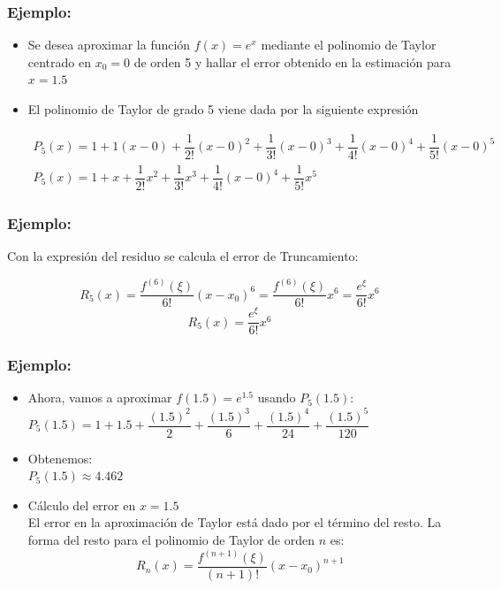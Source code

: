 \documentclass[10pt]{beamer}
\begin{document}
\begin{frame}
  \frametitle{Ejemplo:}
  \begin{itemize}
    \item Se  desea aproximar la funci\'on $f(x)=e^x$ mediante el polinomio de Taylor centrado en $x_0=0$ de orden 5 y hallar el error obtenido en la estimaci\'on para $x=1.5$ 
   
    \item El polinomio de Taylor de grado 5 viene dada por la siguiente expresi\'on
    \begin{block}{}
    \scriptsize{
    $$
    \begin{array}{c}
      P_5(x) = 1+1(x-0)+\dfrac{1}{2!}(x-0)^2+\dfrac{1}{3!}(x-0)^3+\dfrac{1}{4!}(x-0)^4+\dfrac{1}{5!}(x-0)^5\\[10pt]
      P_5(x) = 1+x+\dfrac{1}{2!}x^2+\dfrac{1}{3!}x^3+\dfrac{1}{4!}(x-0)^4+\dfrac{1}{5!}x^5
    \end{array}
    $$}
    \end{block}
  \end{itemize}
\end{frame}
\begin{frame}
  \frametitle[short title]{Ejemplo:}
  Con la expresi\'on del residuo se calcula el error de Truncamiento:
  \begin{block}{}
    $$
    R_5(x) = \dfrac{f^{(6)}(\xi)}{6!}(x-x_0)^6=\dfrac{f^{(6)}(\xi)}{6!}x^6 = \dfrac{e^\xi}{6!}x^6
    $$
    $$
    R_5(x)=\dfrac{e^\xi}{6!}x^6
    $$
  \end{block}
\end{frame}
\begin{frame}
\frametitle{Ejemplo:}
 \begin{itemize}
   \item Ahora, vamos a aproximar $f(1.5) = e^{1.5}$ usando $P_5(1.5)$:\\
   $P_5(1.5) = 1 + 1.5 + \dfrac{(1.5)^2}{2} + \dfrac{(1.5)^3}{6} + \dfrac{(1.5)^4}{24} + \dfrac{(1.5)^5}{120}$
 \item<2-> Obtenemos:\\
   $P_5(1.5) \approx 4.462$
 \item<3-> C\'alculo del error en $x = 1.5$\\
 El error en la aproximaci\'on de Taylor est\'a dado por el t\'ermino del resto. La forma del resto para el polinomio de Taylor de orden $n$ es:\\
 $$
 R_n(x) = \dfrac{f^{(n+1)}(\xi)}{(n+1)!}(x-x_0)^{n+1}
 $$ 
 \end{itemize}
\end{frame}
\end{document}
